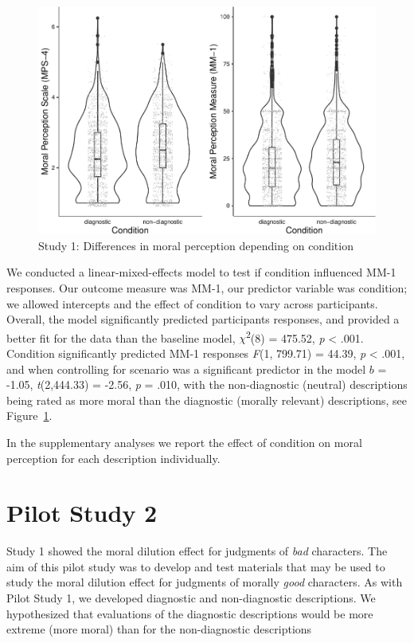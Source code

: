 \documentclass[
  english,
  man,floatsintext]{apa7}
\begin{document}
\begin{figure}
\centering
\includegraphics{moral_dilution_in_chunks_files/figure-latex/S1bothconditionplot-1.pdf}
\caption{\label{fig:S1bothconditionplot}Study 1: Differences in moral perception depending on condition}
\end{figure}

We conducted a linear-mixed-effects model to test if condition influenced MM-1 responses. Our outcome measure was MM-1, our predictor variable was condition; we allowed intercepts and the effect of condition to vary across participants. Overall, the model significantly predicted participants responses, and provided a better fit for the data than the baseline model, \(\chi\)\textsuperscript{2}(8) = 475.52, \emph{p} \textless{} .001. Condition significantly predicted MM-1 responses \emph{F}(1, 799.71) = 44.39, \emph{p} \textless{} .001, and when controlling for scenario was a significant predictor in the model \(b\) = -1.05, \emph{t}(2,444.33) = -2.56, \emph{p} = .010, with the non-diagnostic (neutral) descriptions being rated as more moral than the diagnostic (morally relevant) descriptions, see Figure~\ref{fig:S1bothconditionplot}.

In the supplementary analyses we report the effect of condition on moral perception for each description individually.

\hypertarget{pilot-study-2}{%
\section{Pilot Study 2}\label{pilot-study-2}}

Study 1 showed the moral dilution effect for judgments of \emph{bad} characters. The aim of this pilot study was to develop and test materials that may be used to study the moral dilution effect for judgments of morally \emph{good} characters. As with Pilot Study 1, we developed diagnostic and non-diagnostic descriptions. We hypothesized that evaluations of the diagnostic descriptions would be more extreme (more moral) than for the non-diagnostic descriptions
\end{document}
